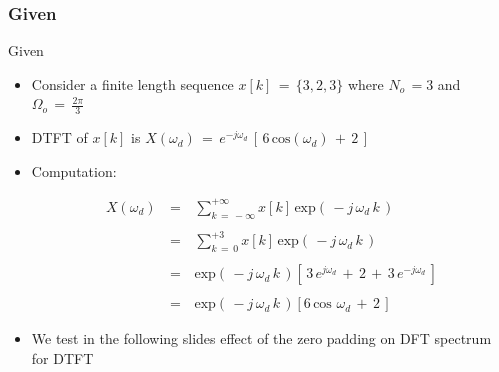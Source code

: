 \subsubsection{Given}
\begin{frame}[t,allowframebreaks]{Given}

\begin{itemize}

\item Consider a finite length sequence $x[k] \, = \, \{3,2,3\}$ where $N_o \, = 3$ and $\Omega_o \, = \, \displaystyle\frac{2 \pi}{3}$


\item DTFT of $x[k]$ is $X(\omega_d) \, = \, e^{-j \omega_d} \, \left[ \, 6 \, \text{cos}(\omega_d) \, + \, 2  \,\right]$

\item Computation:

\begin{equation*}
\begin{array}{rcl}
X(\omega_d) \, &=& \, \displaystyle\sum_{k \, = \, - \infty}^{+ \infty} x[k] \, \text{exp} \left( \,-j \, \omega_d \, k  \,\right) \\ \\
&=& \, \displaystyle\sum_{k \, = \, 0}^{+ 3} x[k] \, \text{exp} \left( \,-j \, \omega_d \, k  \,\right) \\ \\

&=& \, \text{exp} \left( \,-j \, \omega_d \, k  \,\right) \left[ \, 3 \, e^{j \omega_d} \, + \, 2  \, + \, 3 \,  e^{-j \omega_d} \,\right] \\ \\
&=& \, \text{exp} \left( \,-j \, \omega_d \, k  \,\right) \left[ 6 \, \text{cos }\omega_d \, + \, 2 \,\right]
\end{array}
\end{equation*}


\item We test in the following slides effect of the zero padding on DFT spectrum for DTFT

\end{itemize}

\end{frame}


